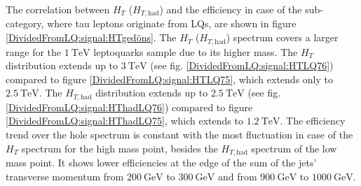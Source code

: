 %
The correlation between $H_{T}$ ($H_{T,\text{had}}$) and the efficiency in case of the sub-category, where tau leptons originate from LQs, are shown in figure \ref{DividedFromLQ:signal:HTgedöns}. The $H_T$ ($H_{T,\text{had}}$) spectrum covers a larger range for the $\SI{1}{\tera\electronvolt}$ leptoquarks sample due to its higher mass. The $H_T$ distribution extends up to $\SI{3}{\tera\electronvolt}$ (see fig. \ref{DividedFromLQ:signal:HTLQ76}) compared to figure \ref{DividedFromLQ:signal:HTLQ75}, which extends only to $\SI{2.5}{\tera\electronvolt}$. The $H_{T,\text{had}}$ distribution extends up to $\SI{2.5}{\tera\electronvolt}$ (see fig. \ref{DividedFromLQ:signal:HThadLQ76}) compared to figure \ref{DividedFromLQ:signal:HThadLQ75}, which extends to $\SI{1.2}{\tera\electronvolt}$. The efficiency trend over the hole spectrum is constant with the most fluctuation in case of the $H_{T}$ spectrum for the high mass point, besides the $H_{T,\text{had}}$ spectrum of the low mass point. It shows lower efficiencies at the edge of the sum of the jets' transverse momentum from $\SI{200}{\giga\electronvolt}$ to $\SI{300}{\giga\electronvolt}$ and from $\SI{900}{\giga\electronvolt}$ to $\SI{1000}{\giga\electronvolt}$.\newline
%

